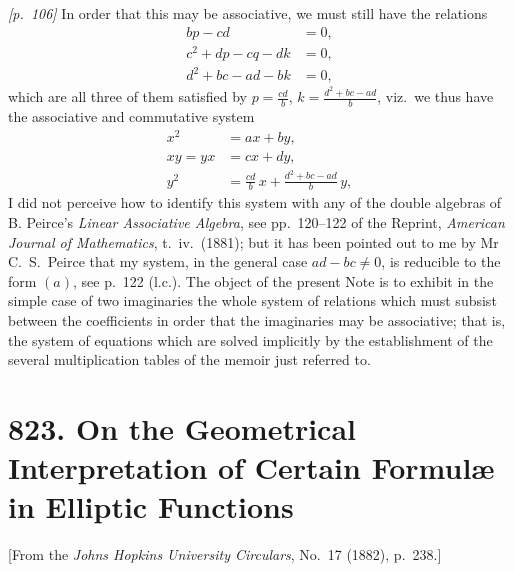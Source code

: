 \documentclass[11pt,a4paper]{article}
\theoremstyle{plain}
\theoremstyle{definition}
\theoremstyle{remark}
\begin{document}
\noindent\textit{[p.~106]} In order that this may be associative, we must still have the relations
\begin{align*}
bp - cd &= 0,\\
c^2 + dp - cq - dk &= 0,\\
d^2 + bc - ad - bk &= 0,
\end{align*}
which are all three of them satisfied by $p = \frac{cd}{b}$, $k = \frac{d^2 + bc - ad}{b}$, viz.\ we thus have the associative and commutative system
\begin{align*}
x^2 &= ax + by,\\
xy = yx &= cx + dy,\\
y^2 &= \frac{cd}{b}\,x + \frac{d^2 + bc - ad}{b}\,y,
\end{align*}
I did not perceive how to identify this system with any of the double algebras of B. Peirce's \textit{Linear Associative Algebra}, see pp.~120--122 of the Reprint, \textit{American Journal of Mathematics}, t.~iv.\ (1881); but it has been pointed out to me by Mr C.\ S.\ Peirce that my system, in the general case $ad - bc \neq 0$, is reducible to the form $(a)$, see p.~122 (l.c.). The object of the present Note is to exhibit in the simple case of two imaginaries the whole system of relations which must subsist between the coefficients in order that the imaginaries may be associative; that is, the system of equations which are solved implicitly by the establishment of the several multiplication tables of the memoir just referred to.

\bigskip

\section*{823. On the Geometrical Interpretation of Certain Formul\ae{} in Elliptic Functions}

\begin{center}
\small[From the \textit{Johns Hopkins University Circulars}, No.~17 (1882), p.~238.]
\end{center}

\bigskip
\end{document}
